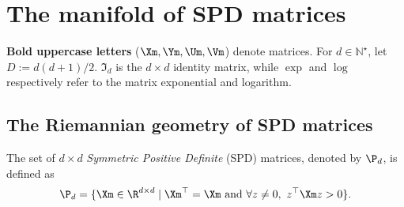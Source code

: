 \documentclass[10pt]{article} %
\theoremstyle{plain}
\theoremstyle{definition}
\theoremstyle{remark}
\begin{document}

\section{The manifold of SPD matrices}
\label{sec:spd_geom}
\textbf{Bold uppercase letters} ($\Xm, \Ym, \Um, \Vm$) denote matrices. For $d \in \mathbb{N}^\star$, let $D := d(d+1)/2$. $\Im_d$ is the $d \times d$ identity matrix, while $\exp$ and $\log$ respectively refer to the matrix exponential and logarithm.
\subsection{The Riemannian geometry of SPD matrices}
The set of $d \times d$ \emph{Symmetric Positive Definite} (SPD) matrices, denoted by $\P_d$, is defined as
\[\P_d = \{\Xm \in \R^{d \times d} \mid \Xm^\top = \Xm \text{ and } \forall z \neq 0,~z^\top \Xm z > 0\}.\]
\end{document}

